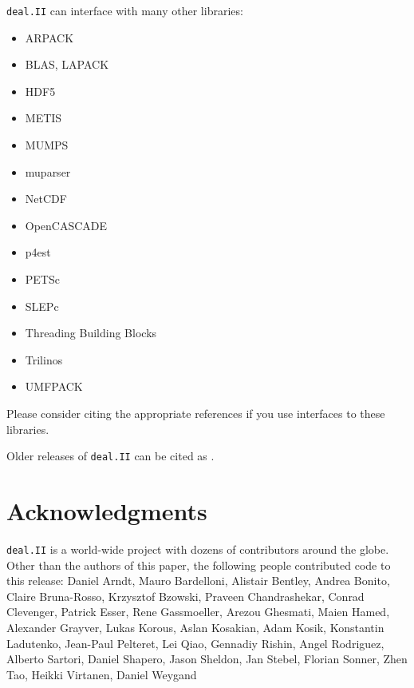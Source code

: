 \documentclass{ansarticle-preprint}
\newcommand{\specialword}[1]{\texttt{#1}}
\newcommand{\dealii}{{\specialword{deal.II}}}
\begin{document}
\dealii{} can interface with many other libraries:
\begin{itemize}
\item ARPACK \cite{arpack}
\item BLAS, LAPACK
\item HDF5 \cite{hdf5}
\item METIS \cite{karypis1998fast}
\item MUMPS \cite{ADE00,MUMPS:1,MUMPS:2,mumps-web-page}
\item muparser \cite{muparser-web-page}
\item NetCDF \cite{rew1990netcdf}
\item OpenCASCADE \cite{opencascade-web-page}
\item p4est \cite{p4est}
\item PETSc \cite{petsc-user-ref,petsc-web-page}
\item SLEPc \cite{Hernandez:2005:SSF}
\item Threading Building Blocks \cite{Rei07}
\item Trilinos \cite{trilinos,trilinos-web-page}
\item UMFPACK \cite{umfpack}
\end{itemize}
Please consider citing the appropriate references if you use interfaces to these
libraries.

Older releases of \dealii{} can be cited as \cite{dealII80,dealII81,dealII82,dealII83}.

\nocite{BangerthKanschat1999}

\section{Acknowledgments}

\dealii{} is a world-wide project with dozens of contributors around the
globe. Other than the authors of this paper, the following people contributed code to
this release:
%
%
Daniel Arndt,
Mauro Bardelloni,
Alistair Bentley,
Andrea Bonito,
Claire Bruna-Rosso,
Krzysztof Bzowski,
Praveen Chandrashekar,
Conrad Clevenger,
Patrick Esser,
Rene Gassmoeller,
Arezou Ghesmati,
Maien Hamed,
Alexander Grayver,
Lukas Korous,
Aslan Kosakian,
Adam Kosik,
Konstantin Ladutenko,
Jean-Paul Pelteret,
Lei Qiao,
Gennadiy Rishin,
Angel Rodriguez,
Alberto Sartori,
Daniel Shapero,
Jason Sheldon,
Jan Stebel,
Florian Sonner,
Zhen Tao,
Heikki Virtanen,
Daniel Weygand
\end{document}
